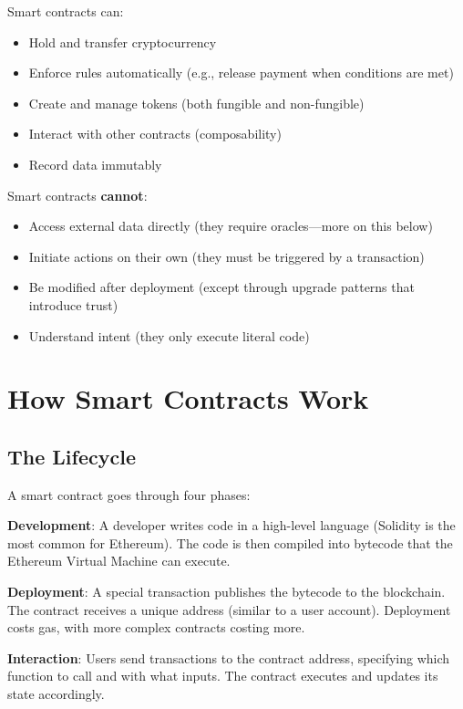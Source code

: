 \documentclass[11pt,a4paper]{article}
\begin{document}
Smart contracts can:
\begin{itemize}
    \item Hold and transfer cryptocurrency
    \item Enforce rules automatically (e.g., release payment when conditions are met)
    \item Create and manage tokens (both fungible and non-fungible)
    \item Interact with other contracts (composability)
    \item Record data immutably
\end{itemize}

Smart contracts \textbf{cannot}:
\begin{itemize}
    \item Access external data directly (they require oracles---more on this below)
    \item Initiate actions on their own (they must be triggered by a transaction)
    \item Be modified after deployment (except through upgrade patterns that introduce trust)
    \item Understand intent (they only execute literal code)
\end{itemize}

\section{How Smart Contracts Work}

\subsection{The Lifecycle}

A smart contract goes through four phases:

\textbf{Development}: A developer writes code in a high-level language (Solidity is the most common for Ethereum). The code is then compiled into bytecode that the Ethereum Virtual Machine can execute.

\textbf{Deployment}: A special transaction publishes the bytecode to the blockchain. The contract receives a unique address (similar to a user account). Deployment costs gas, with more complex contracts costing more.

\textbf{Interaction}: Users send transactions to the contract address, specifying which function to call and with what inputs. The contract executes and updates its state accordingly.
\end{document}
